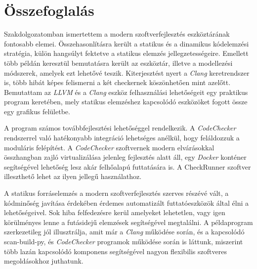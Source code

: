 \documentclass[a4paper,12pt]{report}
\begin{document}
\chapter{Összefoglalás}
Szakdolgozatomban ismertettem a modern szoftverfejlesztés eszköztárának fontosabb elemei. Összehasonlításra került a statikus és a dinamikus kódelemzési stratégia, külön hangsúlyt fektetve a statikus elemzés jellegzetességeire. Emellett több példán keresztül bemutatásra került az eszköztár, illetve a modellezési módszerek, amelyek ezt lehetővé teszik. Kiterjesztést nyert a \emph{Clang} keretrendszer is, több hibát képes felismerni a két checkernek köszönhetően mint azelőtt. Bemutattam az \emph{LLVM} és a \emph{Clang} eszköz felhasználási lehetőségeit egy praktikus program keretében, mely statikus elemzéshez kapcsolódó eszközöket fogott össze egy grafikus felületbe.

A program számos továbbfejlesztési lehetőséggel rendelkezik. A \emph{CodeChecker} rendszerrel való hatékonyabb integráció lehetséges anélkül, hogy feláldozzuk a moduláris felépítést. A \emph{CodeChecker} szoftvernek modern elvárásokkal összhangban zajló virtualizálása jelenleg fejlesztés alatt áll, egy \emph{Docker} konténer segítségével lehetőség lesz akár felhőalapú futtatására is. A CheckRunner szoftver illeszthető lehet az ilyen jellegű használathoz.

A statikus forráselemzés a modern szoftverfejlesztés szerves részévé vált, a kódminőség javítása érdekében érdemes automatizált futtatóeszközök által élni a lehetőségeivel. Sok hiba felfedezésre kerül amelyeket lehetetlen, vagy igen körülményes lenne a futásidejű elemzések segítségével megtalálni. A példaprogram szerkezetileg jól illusztrálja, amit már a \emph{Clang} működése során, és a kapcsolódó scan-build-py, és \emph{CodeChecker} programok működése során is láttunk, miszerint több lazán kapcsolódó komponens segítségével nagyon flexibilis szoftveres megoldásokhoz juthatunk.
\end{document}
